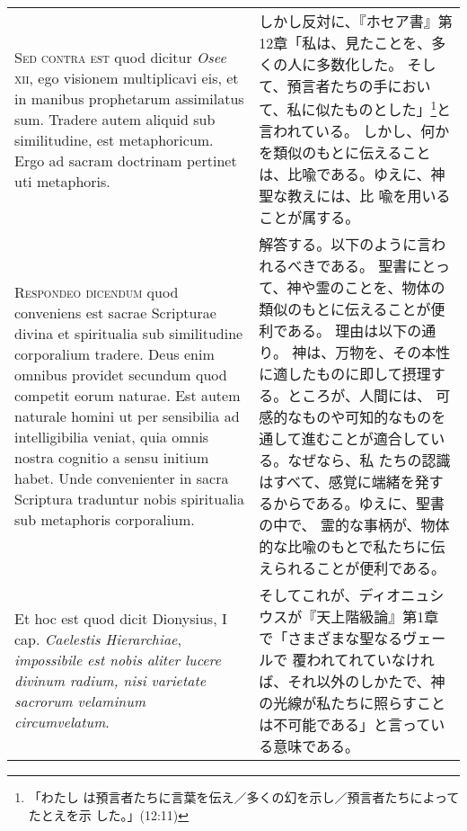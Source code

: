 \documentclass[10pt]{jsarticle} %
\begin{document}
\begin{longtable}{p{21em}p{21em}}
\\


{\scshape Sed contra est} quod dicitur {\itshape Osee} {\scshape xii}, ego
visionem multiplicavi eis, et in manibus prophetarum assimilatus
sum. Tradere autem aliquid sub similitudine, est metaphoricum. Ergo ad
sacram doctrinam pertinet uti metaphoris.


&

しかし反対に、『ホセア書』第12章「私は、見たことを、多くの人に多数化した。
 そして、預言者たちの手において、私に似たものとした」\footnote{「わたし
 は預言者たちに言葉を伝え／多くの幻を示し／預言者たちによってたとえを示
 した。」(12:11)}と言われている。
しかし、何かを類似のもとに伝えることは、比喩である。ゆえに、神聖な教えには、比
 喩を用いることが属する。



\\


{\scshape Respondeo dicendum} quod conveniens est sacrae
Scripturae divina et spiritualia sub similitudine corporalium
tradere. Deus enim omnibus providet secundum quod competit eorum
naturae. Est autem naturale homini ut per sensibilia ad intelligibilia
veniat, quia omnis nostra cognitio a sensu initium habet. Unde
convenienter in sacra Scriptura traduntur nobis spiritualia sub
metaphoris corporalium. 


&

解答する。以下のように言われるべきである。
聖書にとって、神や霊のことを、物体の類似のもとに伝えることが便利である。
 理由は以下の通り。
神は、万物を、その本性に適したものに即して摂理する。ところが、人間には、
 可感的なものや可知的なものを通して進むことが適合している。なぜなら、私
 たちの認識はすべて、感覚に端緒を発するからである。ゆえに、聖書の中で、
 霊的な事柄が、物体的な比喩のもとで私たちに伝えられることが便利である。



\\

Et hoc est quod dicit Dionysius, I
cap. {\itshape Caelestis Hierarchiae}, {\itshape impossibile est nobis
 aliter lucere divinum radium, nisi varietate sacrorum velaminum 
circumvelatum}.


&

そしてこれが、ディオニュシウスが『天上階級論』第1章で「さまざまな聖なるヴェールで
覆われてれていなければ、それ以外のしかたで、神の光線が私たちに照らすこと
 は不可能である」と言っている意味である。

\\


\end{longtable}
\end{document}
